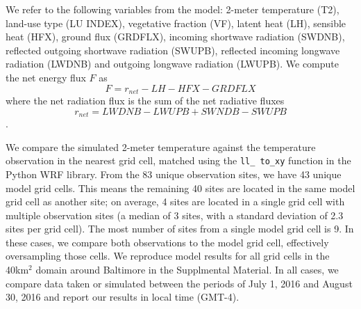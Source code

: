 \documentclass[draft,linenumbers]{agujournal}
\begin{document}
We refer to the following variables from the model: 2-meter temperature (T2),
 land-use type (LU INDEX), vegetative fraction (VF),
 latent heat (LH), 
 sensible heat (HFX), ground flux (GRDFLX), 
incoming shortwave radiation (SWDNB),
reflected outgoing shortwave radiation (SWUPB), 
reflected incoming longwave radiation (LWDNB) and outgoing longwave radiation (LWUPB).  
We compute the net energy flux $F$ as
\begin{equation}
F= r_{net} -LH - HFX - GRDFLX
\end{equation}
where the net radiation flux is the sum of the net radiative fluxes $$r_{net}=LWDNB - LWUPB+ SWNDB-SWUPB$$.

We compare the simulated 2-meter temperature against the temperature observation in the nearest grid cell, matched using the \texttt{ll\_ to\_xy} function in the Python WRF library. 
From the 83 unique observation sites, we have 43 unique model grid cells. This means the remaining 40 sites are located in the same model grid cell as another site; on average, 4 sites are located in a single grid cell with multiple observation sites (a median of 3 sites, with a standard deviation of 2.3 sites per grid cell). The most number of sites from a single model grid cell is 9. In these cases, we compare both observations to the model grid cell, effectively oversampling those cells. 
We reproduce model results for all grid cells in the 40km$^2$ domain around Baltimore in the Supplmental Material. 
In all cases, we compare data taken or simulated between the periods of July 1, 2016 and August 30, 2016 and report our results in local time (GMT-4). 
\end{document}
